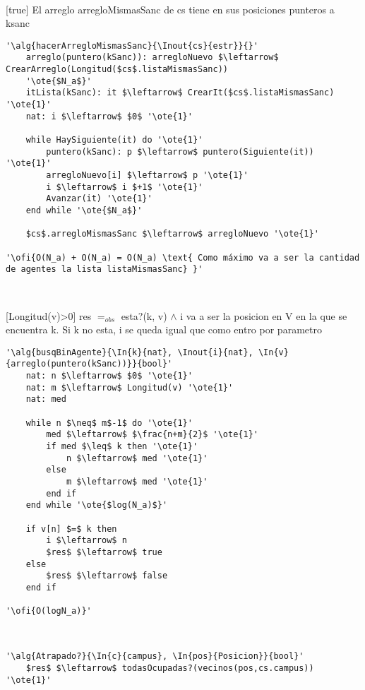 ~


[true]
{El arreglo arregloMismasSanc de cs tiene en sus posiciones punteros a ksanc}


\begin{lstlisting}[mathescape]
'\alg{hacerArregloMismasSanc}{\Inout{cs}{estr}}{}'
	arreglo(puntero(kSanc)): arregloNuevo $\leftarrow$ CrearArreglo(Longitud($cs$.listaMismasSanc))
	'\ote{$N_a$}'
	itLista(kSanc): it $\leftarrow$ CrearIt($cs$.listaMismasSanc) '\ote{1}'
	nat: i $\leftarrow$ $0$ '\ote{1}'

	while HaySiguiente(it) do '\ote{1}'
		puntero(kSanc): p $\leftarrow$ puntero(Siguiente(it)) '\ote{1}'
		arregloNuevo[i] $\leftarrow$ p '\ote{1}'
		i $\leftarrow$ i $+1$ '\ote{1}'
		Avanzar(it) '\ote{1}'
	end while '\ote{$N_a$}'

	$cs$.arregloMismasSanc $\leftarrow$ arregloNuevo '\ote{1}'

'\ofi{O(N_a) + O(N_a) = O(N_a) \text{ Como máximo va a ser la cantidad de agentes la lista listaMismasSanc} }'
\end{lstlisting}

~


[Longitud(v)>0]
{res $=_{obs}$ esta?(k, v) $\land$ i va a ser la posicion en V en la que se encuentra k. Si k no esta, i se queda igual que como entro por parametro}

\begin{lstlisting}[mathescape]
'\alg{busqBinAgente}{\In{k}{nat}, \Inout{i}{nat}, \In{v}{arreglo(puntero(kSanc))}}{bool}'
	nat: n $\leftarrow$ $0$ '\ote{1}'
	nat: m $\leftarrow$ Longitud(v) '\ote{1}'
	nat: med

	while n $\neq$ m$-1$ do '\ote{1}'
		med $\leftarrow$ $\frac{n+m}{2}$ '\ote{1}'
		if med $\leq$ k then '\ote{1}'
			n $\leftarrow$ med '\ote{1}'
		else
			m $\leftarrow$ med '\ote{1}'
		end if
	end while '\ote{$log(N_a)$}'

	if v[n] $=$ k then
		i $\leftarrow$ n
		$res$ $\leftarrow$ true
	else
		$res$ $\leftarrow$ false
	end if

'\ofi{O(logN_a)}'
\end{lstlisting}

~


\begin{lstlisting}[mathescape]
'\alg{Atrapado?}{\In{c}{campus}, \In{pos}{Posicion}}{bool}'
	$res$ $\leftarrow$ todasOcupadas?(vecinos(pos,cs.campus)) '\ote{1}'
\end{lstlisting}

